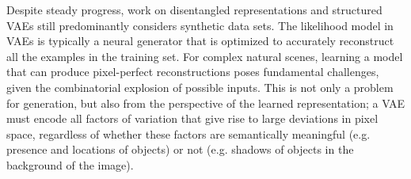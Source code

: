 \documentclass{article}
\begin{document}
Despite steady progress, work on disentangled representations and structured VAEs still predominantly considers synthetic data sets. The likelihood model in VAEs is typically a neural generator that is optimized to accurately reconstruct all the examples in the training set. For complex natural scenes, learning a model that can produce pixel-perfect reconstructions poses fundamental challenges, given the combinatorial explosion of possible inputs. This is not only a problem for generation, but also from the perspective of the learned representation; a VAE must encode all factors of variation that give rise to large deviations in pixel space, regardless of whether these factors are semantically meaningful (e.g. presence and locations of objects) or not (e.g. shadows of objects in the background of the image).




\end{document}
